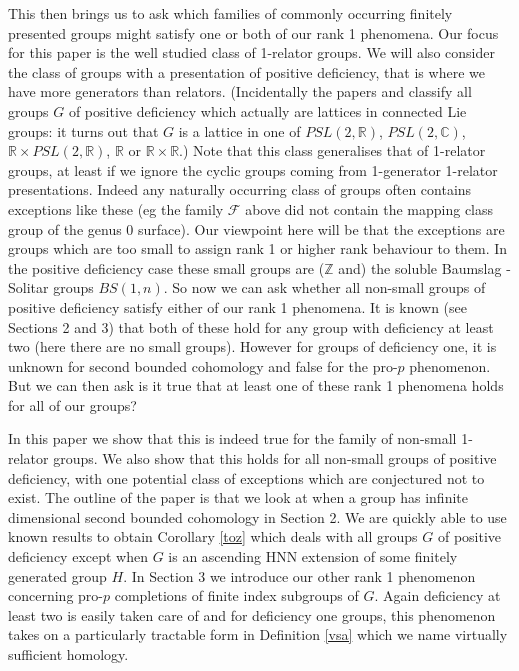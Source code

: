 \documentclass[11pt,reqno]{amsart}
\numberwithin{equation}{section}
\newcommand{\Cc}{\mathbb{C}}
\newcommand{\Z}{\mathbb{Z}}
\newcommand{\R}{\mathbb{R}}
\theoremstyle{definition}
\theoremstyle{remark}
\begin{document}
This then brings us to ask which families of commonly occurring finitely
presented groups might satisfy one or both of our rank 1 phenomena. Our
focus for this paper is the well studied class of 1-relator groups. We
will also consider the class of groups with a
presentation of positive deficiency, that is where we have more generators
than relators. (Incidentally the papers \cite{ltt} and \cite{hll}
classify all groups $G$ of
positive deficiency which actually are lattices in connected Lie groups:
it turns out that $G$ is a lattice in one of 
$PSL(2,\R)$, $PSL(2,\Cc)$, $\R\times PSL(2,\R)$, $\R$ or $\R\times\R$.)
Note that this class generalises that of 1-relator groups,
at least if we ignore the cyclic groups coming from 1-generator
1-relator presentations. Indeed any naturally occurring class of groups
often contains exceptions like these (eg the family $\mathcal F$ above
did not contain the mapping class group of the genus 0 surface).
Our viewpoint here will be that
the exceptions are groups which are too small to assign rank 1 or higher
rank behaviour to them. In the positive deficiency case these small
groups are ($\Z$ and) the soluble Baumslag - Solitar groups $BS(1,n)$.
So now we can ask whether all non-small groups of positive 
deficiency satisfy either of our rank 1 phenomena. It is known
(see Sections 2 and 3) that both
of these hold for any group with deficiency at least two (here there are
no small groups). However for groups of deficiency one, it is unknown for
second bounded cohomology and false for the pro-$p$ phenomenon. But
we can then ask is it true that at least one of these rank 1 phenomena
holds for all of our groups?

In this paper we show that this is indeed true for the family of
non-small 1-relator groups. We also show that this holds for all
non-small groups of positive deficiency, with one potential class
of exceptions which are conjectured not to exist. The outline of
the paper is that we look at when a group has infinite dimensional
second bounded cohomology in Section 2. We are quickly able to use known
results to obtain Corollary \ref{toz} which deals with all groups $G$ of
positive deficiency except when $G$ is an ascending HNN extension of some
finitely generated group $H$.
In Section 3 we introduce our other rank 1 phenomenon concerning pro-$p$
completions of finite index subgroups of $G$. Again deficiency at least two
is easily taken care of and for deficiency one groups, this phenomenon
takes on a particularly tractable form in Definition \ref{vsa} which we
name virtually sufficient homology.
\end{document}
